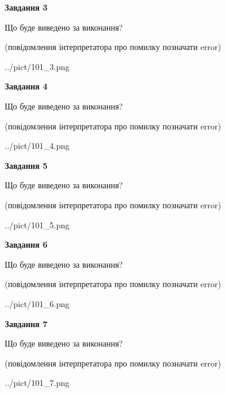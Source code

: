 \documentclass[12pt, ukrainian]{article}
\begin{document}
{\begin {large}
{\begin {center}\textbf{Завдання 3}\end {center}}\par
Що буде виведено за виконання?\par
 (повідомлення інтерпретатора про помилку позначати error)\par
\begin{center}
	{../pict/101_3.png}
\end{center}
\newpage

{\begin {center}\textbf{Завдання 4}\end {center}}\par
Що буде виведено за виконання?\par
 (повідомлення інтерпретатора про помилку позначати error)\par
\begin{center}
	{../pict/101_4.png}
\end{center}
\newpage

{\begin {center}\textbf{Завдання 5}\end {center}}\par
Що буде виведено за виконання?\par
 (повідомлення інтерпретатора про помилку позначати error)\par
\begin{center}
	{../pict/101_5.png}
\end{center}
\newpage

{\begin {center}\textbf{Завдання 6}\end {center}}\par
Що буде виведено за виконання?\par
 (повідомлення інтерпретатора про помилку позначати error)\par
\begin{center}
	{../pict/101_6.png}
\end{center}
\newpage

{\begin {center}\textbf{Завдання 7}\end {center}}\par
Що буде виведено за виконання?\par
 (повідомлення інтерпретатора про помилку позначати error)\par
\begin{center}
	{../pict/101_7.png}
\end{center}
\newpage


\end{large}}
\end{document}
